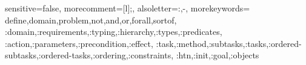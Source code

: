 {
  sensitive=false,    %
  morecomment=[l]{;}, %
  alsoletter={:,-},   %
  morekeywords={
    define,domain,problem,not,and,or,forall,sortof,
    :domain,:requirements,:typing,:hierarchy,:types,:predicates,
    :action,:parameters,:precondition,:effect,
    :task,:method,:subtasks,:tasks,:ordered-subtasks,:ordered-tasks,:ordering,:constraints,
    :htn,:init,:goal,:objects
  }
}